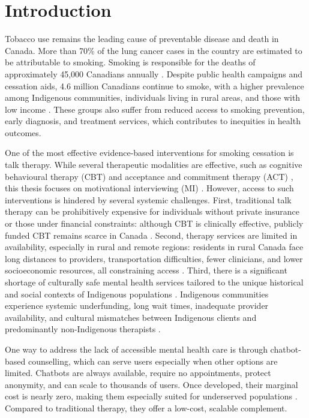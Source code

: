 \chapter{Introduction}

Tobacco use remains the leading cause of preventable disease and death in Canada. More than 70\% of the lung cancer cases in the country are estimated to be attributable to smoking. Smoking is responsible for the deaths of approximately 45,000 Canadians annually \cite{poirier2019estimates}. Despite public health campaigns and cessation aids, 4.6 million Canadians continue to smoke, with a higher prevalence among Indigenous communities, individuals living in rural areas, and those with low income \cite{cpac2020lung}. These groups also suffer from reduced access to smoking prevention, early diagnosis, and treatment services, which contributes to inequities in health outcomes.

One of the most effective evidence-based interventions for smoking cessation is talk therapy. While several therapeutic modalities are effective, such as cognitive behavioural therapy (CBT) \cite{beck2011cognitive} and acceptance and commitment therapy (ACT) \cite{hayes1999acceptance}, this thesis focuses on motivational interviewing (MI) \cite{MillerRollnick2023}. However, access to such interventions is hindered by several systemic challenges. First, traditional talk therapy can be prohibitively expensive for individuals without private insurance or those under financial constraints: although CBT is clinically effective, publicly funded CBT remains scarce in Canada \cite{doi:10.1177/0253717620957496,doi:10.1177/0706743716642416}. Second, therapy services are limited in availability, especially in rural and remote regions: residents in rural Canada face long distances to providers, transportation difficulties, fewer clinicians, and lower socioeconomic resources, all constraining access \cite{burns2007rural,james2021improving}. Third, there is a significant shortage of culturally safe mental health services tailored to the unique historical and social contexts of Indigenous populations \cite{josewski2023improving,hartwasekeesikaw2009cultural}. Indigenous communities experience systemic underfunding, long wait times, inadequate provider availability, and cultural mismatches between Indigenous clients and predominantly non-Indigenous therapists \cite{turner2018poverty}.


One way to address the lack of accessible mental health care is through chatbot-based counselling, which can serve users especially when other options are limited. Chatbots are always available, require no appointments, protect anonymity, and can scale to thousands of users. Once developed, their marginal cost is nearly zero, making them especially suited for underserved populations \cite{torous2017digital,miner2016smartphone}. Compared to traditional therapy, they offer a low-cost, scalable complement.



